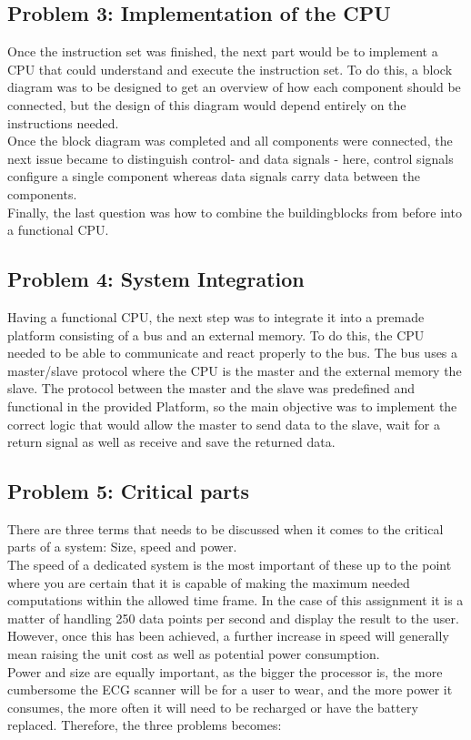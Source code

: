 \documentclass[12pt,a4paper]{article}
\begin{document}
\subsection{Problem 3: Implementation of the CPU}
	Once the instruction set was finished, the next part would be to implement a CPU that could understand and execute the instruction set. To do this, a block diagram was to be designed to get an overview of how each component should be connected, but the design of this diagram would depend entirely on the instructions needed.\\
	Once the block diagram was completed and all components were connected, the next issue became to distinguish control- and data signals - here, control signals configure a single component whereas data signals carry data between the components.\\
	Finally, the last question was how to combine the buildingblocks from before into a functional CPU.\\
	
\subsection{Problem 4: System Integration}
	Having a functional CPU, the next step was to integrate it into a premade platform consisting of a bus and an external memory. To do this, the CPU needed to be able to communicate and react properly to the bus. The bus uses a master/slave protocol where the CPU is the master and the external memory the slave. The protocol between the master and the slave was predefined and functional in the provided Platform, 
	so the main objective was to implement the correct logic that would allow the master to send data to the slave, wait for a return signal as well as receive and save the returned data.\\
	
\subsection{Problem 5: Critical parts}
	There are three terms that needs to be discussed when it comes to the critical parts of a system: Size, speed and power.\\
	The speed of a dedicated system is the most important of these up to the point where you are certain that it is capable of making the maximum needed computations within the allowed time frame. In the case of this assignment it is a matter of handling 250 data points per second and display the result to the user. However, once this has been achieved, a further increase in speed will generally mean raising the unit cost as well as potential power consumption.\\
	Power and size are equally important, as the bigger the processor is, the more cumbersome the ECG scanner will be for a user to wear, and the more power it consumes, the more often it will need to be recharged or have the battery replaced. Therefore, the three problems becomes:
	
\end{document}
